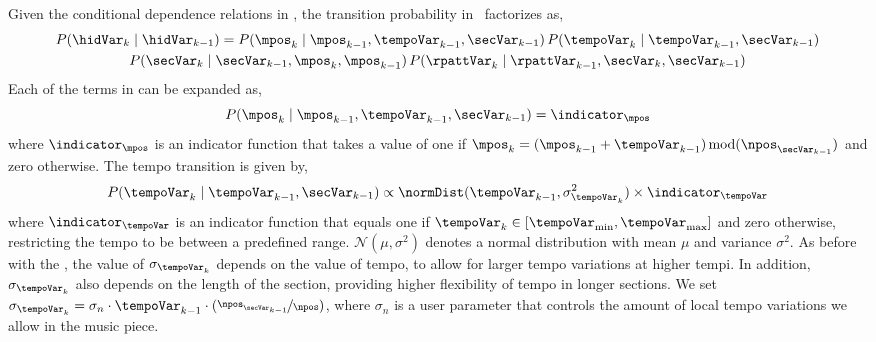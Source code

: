 \noindent Given the conditional dependence relations in , the transition probability in \spmodel\ factorizes as, 
%
\begin{multline}
P(\hidVar_{k} \mid \hidVar_{k-1}) = P(\mpos_k \mid \mpos_{k-1},\tempoVar_{k-1},\secVar_{k-1})\,P(\tempoVar_{k} \mid \tempoVar_{k-1},\secVar_{k-1}) \\ P(\secVar_{k} \mid \secVar_{k-1},\mpos_{k},\mpos_{k-1})\,P(\rpattVar_{k} \mid \rpattVar_{k-1},\secVar_{k},\secVar_{k-1}) \label{eqn:spm:transx}
\end{multline}
%
Each of the terms in  can be expanded as, 
\begin{equation}\label{eqn:spm:transmpos}
P(\mpos_{k} \mid \mpos_{k-1},\tempoVar_{k-1},\secVar_{k-1}) = \indicator_{\mpos}
\end{equation}
%
where $\indicator_{\mpos}$ is an indicator function that takes a value of one if $\mpos_{k} = (\mpos_{k-1} + \tempoVar_{k-1})\!\!\!\mod\!\!(\npos_{\secVar_{k-1}})$ and zero otherwise. The tempo transition is given by,
\begin{equation}\label{eqn:spm:transtempo}
P(\tempoVar_{k} \mid \tempoVar_{k-1},\secVar_{k-1})\propto\normDist(\tempoVar_{k-1},\sigma_{\tempoVar_k}^{2})\times \indicator_{\tempoVar}
\end{equation}
where $\indicator_{\tempoVar}$ is an indicator function that equals one if $\tempoVar_{k} \in [\tempoVar_{\min}, \tempoVar_{\max}]$ and zero otherwise, restricting the tempo to be between a predefined range. $\mathcal{N}(\mu,\sigma^2)$ denotes a normal distribution with mean $\mu$ and variance $\sigma^{2}$. As before with the \bpmodel, the value of $\sigma_{\tempoVar_k}$ depends on the value of tempo, to allow for larger tempo variations at higher tempi. In addition, $\sigma_{\tempoVar_k}$ also depends on the length of the section, providing higher flexibility of tempo in longer sections. We set $\sigma_{\tempoVar_k} = \sigma_n \cdot \tempoVar_{k-1} \cdot (\nicefrac{\npos_{\secVar_{k-1}}}{\npos})$, where $\sigma_n$ is a user parameter that controls the amount of local tempo variations we allow in the music piece. 

